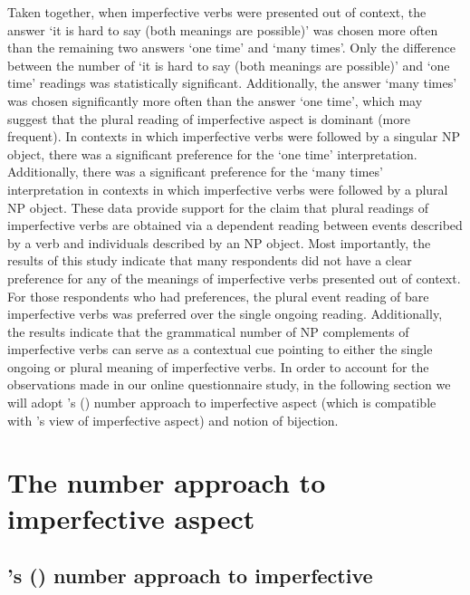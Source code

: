 \documentclass[output=paper]{langscibook}
\begin{document}
Taken together, when imperfective verbs were presented out of context, the answer ‘it is hard to say (both meanings are possible)’ was chosen more often than the remaining two answers ‘one time’ and ‘many times’. Only the difference between the number of ‘it is hard to say (both meanings are possible)’ and ‘one time’ readings was statistically significant. Additionally, the answer ‘many times’ was chosen significantly more often than the answer ‘one time’, which may suggest that the plural reading of imperfective aspect is dominant (more frequent). In contexts in which imperfective verbs were followed by a singular NP object, there was a significant preference for the ‘one time’ interpretation. Additionally, there was a significant preference for the ‘many times’ interpretation in contexts in which imperfective verbs were followed by a plural NP object. These data provide support for the claim that plural readings of imperfective verbs are obtained via a dependent reading between events described by a verb and individuals described by an NP object. Most importantly, the results of this study indicate that many respondents did not have a clear preference for any of the meanings of imperfective verbs presented out of context. For those respondents who had preferences, the plural event reading of bare imperfective verbs was preferred over the single ongoing reading. Additionally, the results indicate that the grammatical number of NP complements of imperfective verbs can serve as a contextual cue pointing to either the single ongoing or plural meaning of imperfective verbs. In order to account for the observations made in our online questionnaire study, in the following section we will adopt \citeauthor{Ferreira2004}'s (\citeyear{Ferreira2004, Ferreira2005}) number approach to imperfective aspect (which is compatible with \citeauthor{Kagan2008}'s \citeyear{Kagan2008, Kagan2010} view of imperfective aspect) and  notion of bijection.

\section{The number approach to imperfective aspect}\label{jan-bla:fansb:kb:sec4}

\subsection{\citeauthor{Ferreira2004}'s (\citeyear{Ferreira2004, Ferreira2005}) number approach to imperfective}\label{jan-bla:fansb:kb:sec4.1}
\end{document}
